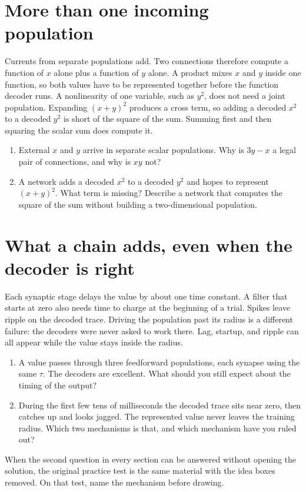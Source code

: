 \documentclass[11pt,letterpaper]{article}
\begin{document}
\section{More than one incoming population}

\begin{idea}
Currents from separate populations add. Two connections therefore compute a function of \(x\) alone plus a function of \(y\) alone. A product mixes \(x\) and \(y\) inside one function, so both values have to be represented together before the function decoder runs. A nonlinearity of one variable, such as \(y^2\), does not need a joint population. Expanding \((x+y)^2\) produces a cross term, so adding a decoded \(x^2\) to a decoded \(y^2\) is short of the square of the sum. Summing first and then squaring the scalar sum does compute it.
\end{idea}

\begin{enumerate}
\item External \(x\) and \(y\) arrive in separate scalar populations. Why is \(3y - x\) a legal pair of connections, and why is \(xy\) not?
\item A network adds a decoded \(x^2\) to a decoded \(y^2\) and hopes to represent \((x+y)^2\). What term is missing? Describe a network that computes the square of the sum without building a two-dimensional population.
\end{enumerate}

\section{What a chain adds, even when the decoder is right}

\begin{idea}
Each synaptic stage delays the value by about one time constant. A filter that starts at zero also needs time to charge at the beginning of a trial. Spikes leave ripple on the decoded trace. Driving the population past its radius is a different failure: the decoders were never asked to work there. Lag, startup, and ripple can all appear while the value stays inside the radius.
\end{idea}

\begin{enumerate}
\item A value passes through three feedforward populations, each synapse using the same \(\tau\). The decoders are excellent. What should you still expect about the timing of the output?
\item During the first few tens of milliseconds the decoded trace sits near zero, then catches up and looks jagged. The represented value never leaves the training radius. Which two mechanisms is that, and which mechanism have you ruled out?
\end{enumerate}

\vspace{6pt}
When the second question in every section can be answered without opening the solution, the original practice test is the same material with the idea boxes removed. On that test, name the mechanism before drawing.
\end{document}
